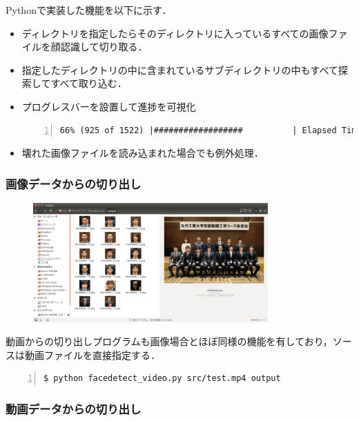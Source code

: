 \documentclass[dvipdfmx,11pt,notheorems]{beamer}
\theoremstyle{definition}
\begin{document}
\begin{frame}[fragile]
\begin{frame}[fragile]
Pythonで実装した機能を以下に示す．
\begin{itemize}
 \item ディレクトリを指定したらそのディレクトリに入っているすべての画像ファイルを顔認識して切り取る．
 \item 指定したディレクトリの中に含まれているサブディレクトリの中もすべて探索してすべて取り込む．
 \item プログレスバーを設置して進捗を可視化

\begin{lstlisting}[basicstyle=\ttfamily\footnotesize, frame=single, firstnumber=1, numbers=left, breaklines=true]
66% (925 of 1522) |##################          | Elapsed Time: 0:00:07 ETA:  0:04:26
\end{lstlisting}

 \item 壊れた画像ファイルを読み込まれた場合でも例外処理．
\end{itemize}
\end{frame}

\begin{frame}[fragile]\frametitle{画像データからの切り出し}
\begin{figure}[t]
  \begin{center}
    \includegraphics[width=9cm]{fig/eps/facedetection.eps}
  \end{center}
\end{figure}

動画からの切り出しプログラムも画像場合とほぼ同様の機能を有しており，ソースは動画ファイルを直接指定する．

\begin{lstlisting}[basicstyle=\ttfamily\footnotesize, frame=single, firstnumber=1, numbers=left, breaklines=true]
$ python facedetect_video.py src/test.mp4 output
\end{lstlisting}
\end{frame}

\begin{frame}[fragile]\frametitle{動画データからの切り出し}



\end{frame}
\end{frame}
\end{document}
